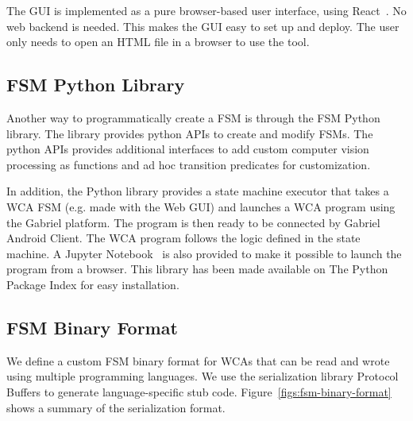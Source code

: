 The GUI is implemented as a pure browser-based user interface, using
React~\cite{staff2016react}. No web backend is needed. This makes the GUI easy
to set up and deploy. The user only needs to open an HTML file in a browser to 
use the tool.

\subsection{FSM Python Library}

Another way to programmatically create a FSM is through the FSM Python library.
The library provides python APIs to create and modify FSMs. The python APIs
provides additional interfaces to add custom computer vision processing as
functions and ad hoc transition predicates for customization. 

In addition, the Python library provides a state machine executor that takes a
WCA FSM (e.g. made with the Web GUI) and launches a WCA program using the
Gabriel platform. The program is then ready to be connected by Gabriel Android
Client. The WCA program follows the logic defined in the state machine. A
Jupyter Notebook~\cite{kluyver2016jupyter} is also provided to make it possible to launch the program from
a browser. This library has been made available on The Python Package Index for
easy installation.

\subsection{FSM Binary Format}

We define a custom FSM binary format for WCAs that can be read and wrote using
multiple programming languages. We use the serialization library Protocol
Buffers to generate language-specific stub code.
Figure~\ref{figs:fsm-binary-format} shows a summary of the serialization format.


